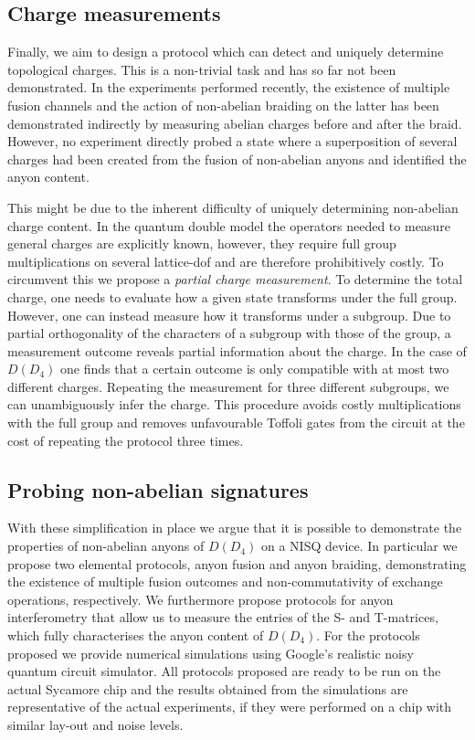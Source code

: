 \documentclass[a4paper,twocolumn,11pt, accepted=2024-06-14]{quantumarticle}
\begin{document}
\subsection{Charge measurements}
Finally, we aim to design a protocol which can detect and uniquely determine topological charges. This is a non-trivial task and has so far not been demonstrated. In the experiments performed recently, the existence of multiple fusion channels and the action of non-abelian braiding on the latter has been demonstrated indirectly by measuring abelian charges before and after the braid. However, no experiment directly probed a state where a superposition of several charges had been created from the fusion of non-abelian anyons and identified the anyon content. 


This might be due to the inherent difficulty of uniquely determining non-abelian charge content. In the quantum double model the operators needed to measure general charges are explicitly known, however, they require full group multiplications on several lattice-dof and are therefore prohibitively costly. To circumvent this we propose a \emph{partial charge measurement}. To determine the total charge, one needs to evaluate how a given state transforms under the full group. However, one can instead measure how it transforms under a subgroup. Due to partial orthogonality of the characters of a subgroup with those of the group, a measurement outcome reveals partial information about the charge. In the case of $D(D_4)$ one finds that a certain outcome is only compatible with at most two different charges. Repeating the measurement for three different subgroups, we can unambiguously infer the charge. This procedure avoids costly multiplications with the full group and removes unfavourable Toffoli gates from the circuit at the cost of repeating the protocol three times.



\subsection{Probing non-abelian signatures}
With these simplification in place we argue that it is possible to demonstrate the properties of non-abelian anyons of $D(D_4)$ on a NISQ device. In particular we propose two elemental protocols, anyon fusion and anyon braiding, demonstrating the existence of multiple fusion outcomes and non-commutativity of exchange operations, respectively. We furthermore propose protocols for anyon interferometry that allow us to measure the entries of the S- and T-matrices, which fully characterises the anyon content of $D(D_4)$. For the protocols proposed we provide numerical simulations using Google's realistic noisy quantum circuit simulator. All protocols proposed are ready to be run on the actual Sycamore chip and the results obtained from the simulations are representative of the actual experiments, if they were performed on a chip with similar lay-out and noise levels. 
\end{document}
